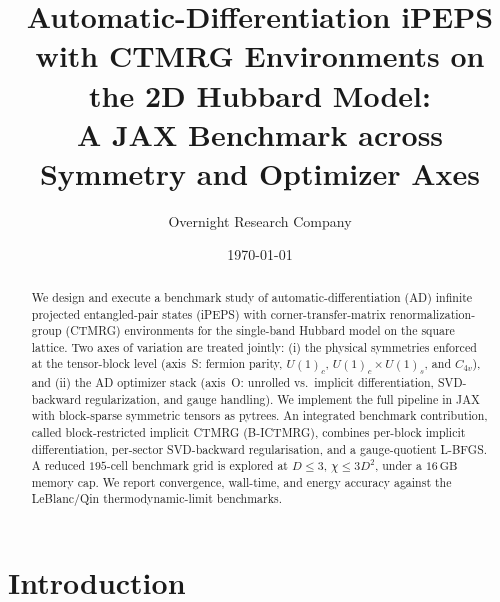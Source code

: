 \documentclass[aps,prb,reprint,amsmath,amssymb,floatfix]{revtex4-2}
\begin{document}
\title{Automatic-Differentiation iPEPS with CTMRG Environments on the 2D Hubbard Model: \\
A JAX Benchmark across Symmetry and Optimizer Axes}

\author{Overnight Research Company}
\date{\today}

\begin{abstract}
We design and execute a benchmark study of automatic-differentiation (AD) infinite projected entangled-pair states (iPEPS) with corner-transfer-matrix renormalization-group (CTMRG) environments for the single-band Hubbard model on the square lattice. Two axes of variation are treated jointly: (i) the physical symmetries enforced at the tensor-block level (axis~S: fermion parity, $U(1)_c$, $U(1)_c\!\times\! U(1)_s$, and $C_{4v}$), and (ii) the AD optimizer stack (axis~O: unrolled vs.~implicit differentiation, SVD-backward regularization, and gauge handling). We implement the full pipeline in JAX with block-sparse symmetric tensors as pytrees. An integrated benchmark contribution, called block-restricted implicit CTMRG (B-ICTMRG), combines per-block implicit differentiation, per-sector SVD-backward regularisation, and a gauge-quotient L-BFGS. A reduced $195$-cell benchmark grid is explored at $D\!\leq\! 3$, $\chi\!\leq\! 3D^2$, under a $16\,\mathrm{GB}$ memory cap. We report convergence, wall-time, and energy accuracy against the LeBlanc/Qin thermodynamic-limit benchmarks.
\end{abstract}

\maketitle

\section{Introduction}
\end{document}
